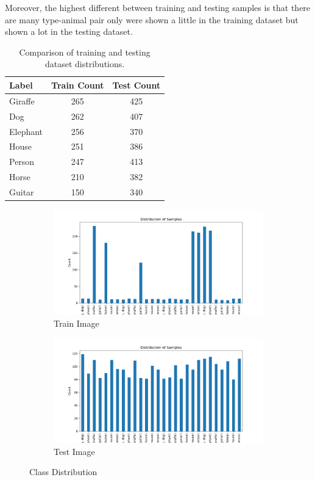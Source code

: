 \documentclass{article}
\begin{document}
Moreover, the highest different between training and testing samples is that there are many type-animal pair only were shown a little in the training dataset but shown a lot in the testing dataset.


\begin{table}[h]
    \centering
    \begin{tabular}{lcc}
    \toprule
    Label & Train Count & Test Count \\
    \midrule
    Giraffe   & 265 & 425 \\
    Dog       & 262 & 407 \\
    Elephant  & 256 & 370 \\
    House     & 251 & 386 \\
    Person    & 247 & 413 \\
    Horse     & 210 & 382 \\
    Guitar    & 150 & 340 \\
    \bottomrule
    \end{tabular}
    \caption{Comparison of training and testing dataset distributions.}
    \label{tab:dataset_distribution}
\end{table}

\begin{figure}[h!]
    \centering
    \begin{subfigure}{0.45\textwidth}
        \includegraphics[width=\textwidth]{./pic/class_distribution_1641.png}
        \caption{Train Image}
    \end{subfigure}
    \hfill %
    \begin{subfigure}{0.45\textwidth}
        \includegraphics[width=\textwidth]{./pic/class_distribution_2723.png}
        \caption{Test Image}
    \end{subfigure}
    \caption{Class Distribution}
    \label{fig:class_distribution}
\end{figure}
\end{document}
